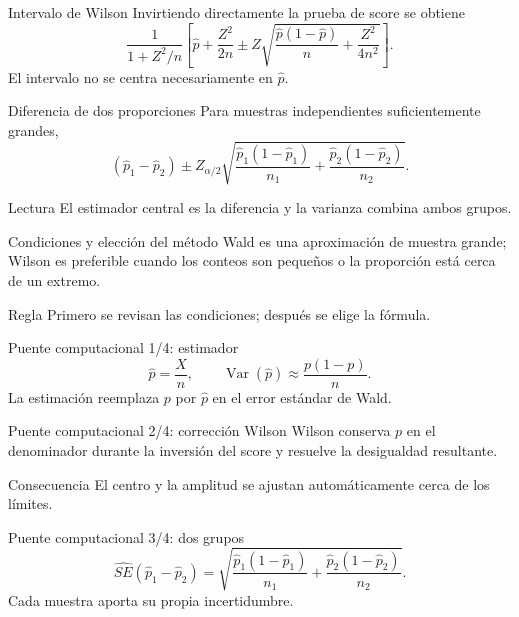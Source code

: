 \documentclass[10pt,aspectratio=169]{beamer}
\begin{document}
\begin{frame}{Intervalo de Wilson}
  \footnotesize
  Invirtiendo directamente la prueba de score se obtiene
  \[
  \frac{1}{1+Z^2/n}\left[\hat p+\frac{Z^2}{2n}\pm
  Z\sqrt{\frac{\hat p(1-\hat p)}{n}+\frac{Z^2}{4n^2}}\right].
  \]
  El intervalo no se centra necesariamente en $\hat p$.
\end{frame}

\begin{frame}{Diferencia de dos proporciones}
  \footnotesize
  Para muestras independientes suficientemente grandes,
  \[
    (\hat p_1-\hat p_2)\pm Z_{\alpha/2}
    \sqrt{\frac{\hat p_1(1-\hat p_1)}{n_1}+
    \frac{\hat p_2(1-\hat p_2)}{n_2}}.
  \]
  \begin{alertblock}{Lectura}
    El estimador central es la diferencia y la varianza combina ambos grupos.
  \end{alertblock}
\end{frame}

\begin{frame}{Condiciones y elección del método}
  \footnotesize
  Wald es una aproximación de muestra grande; Wilson es preferible cuando los
  conteos son pequeños o la proporción está cerca de un extremo.
  \begin{alertblock}{Regla}
    Primero se revisan las condiciones; después se elige la fórmula.
  \end{alertblock}
\end{frame}

\begin{frame}{Puente computacional 1/4: estimador}
  \footnotesize
  \[
    \hat p=\frac{X}{n},\qquad
    \operatorname{Var}(\hat p)\approx\frac{p(1-p)}{n}.
  \]
  La estimación reemplaza $p$ por $\hat p$ en el error estándar de Wald.
\end{frame}

\begin{frame}{Puente computacional 2/4: corrección Wilson}
  \footnotesize
  Wilson conserva $p$ en el denominador durante la inversión del score y
  resuelve la desigualdad resultante.
  \begin{block}{Consecuencia}
    El centro y la amplitud se ajustan automáticamente cerca de los límites.
  \end{block}
\end{frame}

\begin{frame}{Puente computacional 3/4: dos grupos}
  \footnotesize
  \[
    \widehat{SE}(\hat p_1-\hat p_2)=
    \sqrt{\frac{\hat p_1(1-\hat p_1)}{n_1}+
    \frac{\hat p_2(1-\hat p_2)}{n_2}}.
  \]
  Cada muestra aporta su propia incertidumbre.
\end{frame}
\end{document}
